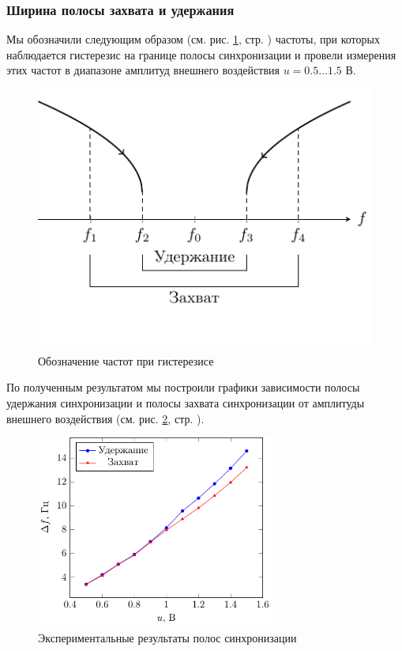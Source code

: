\documentclass[a4paper,14pt]{extarticle}
\begin{document}
\subsubsection{Ширина полосы захвата и удержания}

Мы обозначили следующим образом (см. рис. \ref{fig:band}, стр. \pageref{fig:band}) частоты, при которых наблюдается гистерезис на границе полосы синхронизации и провели измерения этих частот в диапазоне амплитуд внешнего воздействия $u=0.5\ldots 1.5$ В.
\begin{figure}[h!]
	\centering
	\includegraphics[scale=1.5]{fig/band.pdf}
	\vspace{-2em}
	\caption{Обозначение частот при гистерезисе}
	\label{fig:band}
\end{figure}
По полученным результатом мы построили графики зависимости полосы удержания синхронизации и полосы захвата синхронизации от амплитуды внешнего воздействия (см. рис. \ref{fig:band2}, стр. \pageref{fig:band2}).
\begin{figure}[H]
	\centering
	\includegraphics[width=0.7\textwidth]{plot/band.pdf}
	\vspace{-1em}
	\caption{Экспериментальные результаты полос синхронизации}
	\label{fig:band2}
\end{figure}
\end{document}
